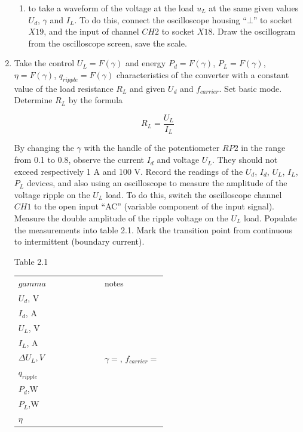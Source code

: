\documentclass[a4paper,14pt]{article}
\begin{document}
\begin{enumerate}
\begin{enumerate}
\item to take a waveform of the voltage at the load $u_L$ at the same given values $U_d$, $\gamma$ and $I_L$.
To do this, connect the oscilloscope housing ``$\bot$'' to socket $X19$, and the input of channel $CH2$ to socket $X18$.
Draw the oscillogram from the oscilloscope screen, save the scale.
\end{enumerate}

\item Take the control $U_L = F(\gamma)$ and energy $P_d = F(\gamma)$, $P_L=F (\gamma)$, $\eta=F(\gamma)$, 
$q_{ripple} = F(\gamma)$ characteristics of the converter with a constant value of the load resistance $R_L$ and given $U_d$ 
and $f_{carrier}$. Set basic mode.
Determine $R_L$ by the formula

$$
R_L = \frac{U_L}{I_L}
$$

By changing the $\gamma$ with the handle of the potentiometer $RP2$ in the range from 0.1 to 0.8, observe the current $I_d$ and voltage $U_L$. They should not exceed respectively 1 A and 100 V.
Record the readings of the $U_d$, $I_d$, $U_L$, $I_L$, $P_L$ devices, and also using an oscilloscope to measure the amplitude of the voltage ripple on the $U_L$ load.
To do this, switch the oscilloscope channel $CH1$ to the open input ``AC'' (variable component of the input signal).
Measure the double amplitude of the ripple voltage on the $U_L$ load.
Populate the measurements into table 2.1.
Mark the transition point from continuous to intermittent (boundary current).

Table 2.1

\begin{tabular}{l|p{10pt}|p{10pt}|p{10pt}|p{10pt}|p{10pt}|p{10pt}|p{100pt}}
        $gamma$ & &&&&&& notes\\
        \cmidrule{1-8}
        $U_d$, V &&&&&&&\multirow{9}{*}{\begin{minipage}{0.3\textwidth}$\gamma=$, $f_{carrier}=$ \end{minipage}}\\
        \cmidrule{1-7}
        $I_d$, A &&&&&&\\
        \cmidrule{1-7}
$U_L$, V &&&&&&\\
        \cmidrule{1-7}
        $I_L$, A &&&&&&\\
        \cmidrule{1-7}
        ${\scriptstyle \Delta}U_L, V$&&&&&&\\
        \cmidrule{1-7}
	$q_{ripple}$ &&&&&&\\
        \cmidrule{1-7}
$P_d$,W &&&&&&\\
        \cmidrule{1-7}
$P_L$,W &&&&&&\\
        \cmidrule{1-7}
$\eta$&&&&&&\\
\end{tabular}


\end{enumerate}
\end{document}
